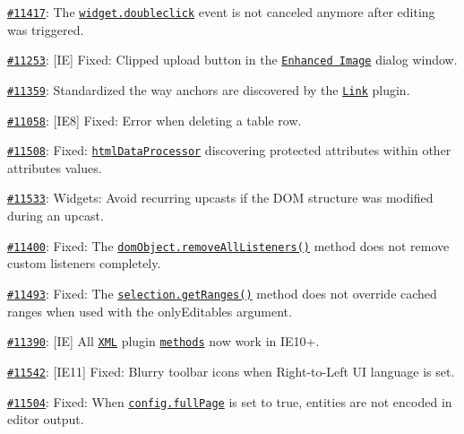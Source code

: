 {\begin{DoxyItemize}
\item \href{http://dev.ckeditor.com/ticket/11417}{\tt \#11417}\+: The \href{http://docs.ckeditor.com/#!/api/CKEDITOR.plugins.widget-event-doubleclick}{\tt {\ttfamily widget.\+doubleclick}} event is not canceled anymore after editing was triggered.
\item \href{http://dev.ckeditor.com/ticket/11253}{\tt \#11253}\+: \mbox{[}IE\mbox{]} Fixed\+: Clipped upload button in the \href{http://ckeditor.com/addon/image2}{\tt Enhanced Image} dialog window.
\item \href{http://dev.ckeditor.com/ticket/11359}{\tt \#11359}\+: Standardized the way anchors are discovered by the \href{http://ckeditor.com/addon/link}{\tt Link} plugin.
\item \href{http://dev.ckeditor.com/ticket/11058}{\tt \#11058}\+: \mbox{[}I\+E8\mbox{]} Fixed\+: Error when deleting a table row.
\item \href{http://dev.ckeditor.com/ticket/11508}{\tt \#11508}\+: Fixed\+: \href{http://docs.ckeditor.com/#!/api/CKEDITOR.htmlDataProcessor}{\tt {\ttfamily html\+Data\+Processor}} discovering protected attributes within other attributes\textquotesingle{} values.
\item \href{http://dev.ckeditor.com/ticket/11533}{\tt \#11533}\+: Widgets\+: Avoid recurring upcasts if the D\+OM structure was modified during an upcast.
\item \href{http://dev.ckeditor.com/ticket/11400}{\tt \#11400}\+: Fixed\+: The \href{http://docs.ckeditor.com/#!/api/CKEDITOR.dom.domObject-method-removeAllListeners}{\tt {\ttfamily dom\+Object.\+remove\+All\+Listeners()}} method does not remove custom listeners completely.
\item \href{http://dev.ckeditor.com/ticket/11493}{\tt \#11493}\+: Fixed\+: The \href{http://docs.ckeditor.com/#!/api/CKEDITOR.dom.selection-method-getRanges}{\tt {\ttfamily selection.\+get\+Ranges()}} method does not override cached ranges when used with the {\ttfamily only\+Editables} argument.
\item \href{http://dev.ckeditor.com/ticket/11390}{\tt \#11390}\+: \mbox{[}IE\mbox{]} All \href{http://ckeditor.com/addon/xml}{\tt X\+ML} plugin \href{http://docs.ckeditor.com/#!/api/CKEDITOR.xml}{\tt methods} now work in I\+E10+.
\item \href{http://dev.ckeditor.com/ticket/11542}{\tt \#11542}\+: \mbox{[}I\+E11\mbox{]} Fixed\+: Blurry toolbar icons when Right-\/to-\/\+Left UI language is set.
\item \href{http://dev.ckeditor.com/ticket/11504}{\tt \#11504}\+: Fixed\+: When \href{http://docs.ckeditor.com/#!/api/CKEDITOR.config-cfg-fullPage}{\tt {\ttfamily config.\+full\+Page}} is set to {\ttfamily true}, entities are not encoded in editor output.

\end{DoxyItemize}}
